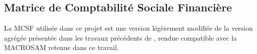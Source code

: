 \documentclass[11pt,a4paper]{article}
\begin{document}
	\begin{table}[!h]
		\renewcommand{\arraystretch}{1.5} %
		\centering
		\caption{Matrice de Comptabilité Sociale Financière de Madagascar. Année 2019. En Milliards d'Ariary.}
		\label{tab:FSAMvalues}%
	\end{table}%
	
	

	
	\subsection{Matrice de Comptabilité Sociale Financière}
	La MCSF utilisée dans ce projet est une version légèrement modifiée de la version agrégée présentée dans les travaux précédents de \cite{Ramaharo2022}, rendue compatible avec la MACROSAM retenue dans ce travail. 
	
\end{document}
